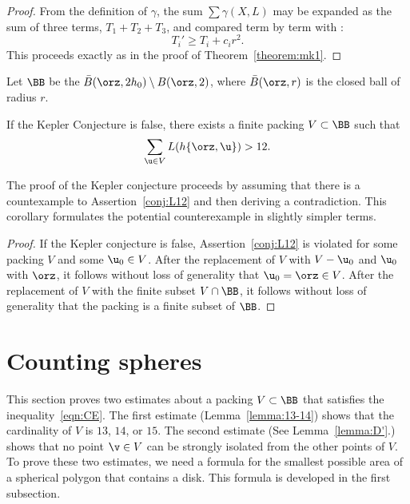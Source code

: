 \begin{proof}
From the definition of $\gamma$, the sum $\sum \gamma(X,L)$ may be
expanded as the sum of three terms, $T_1+T_2+T_3$, and compared term
by term with :
\begin{displaymath} 
T_i' \ge T_i + c_i r^2.
\end{displaymath}
This proceeds exactly as in the proof of Theorem~\ref{theorem:mk1}.
\end{proof}

\begin{definition}[$\BB$] 
Let $\BB$ be the
 $\bar B(\orz,2h_0)\setminus B(\orz,2)$, where
$\bar B(\orz,r)$ is the closed ball of radius $r$.
\end{definition}


\begin{corollary}\label{cor:CE} 
  If the Kepler Conjecture is false, there exists a finite packing
  $V\subset\BB$ such that
\begin{equation}\label{eqn:CE} 
\sum_{ \u\in V} L(h\{\orz, \u\}) > 12.
\end{equation}
\end{corollary}

The proof of the Kepler conjecture proceeds by assuming that there is
a countexample to Assertion~\ref{conj:L12} and then deriving a contradiction.
This corollary formulates the potential counterexample in slightly simpler terms.

\begin{proof} If the Kepler conjecture is false,
Assertion~\ref{conj:L12} is violated for some packing $ V$ and some
$ \u_0\in V$.  After the replacement of $ V$ with $ V - \u_0$ and $
\u_0$ with $\orz$, it follows without loss of generality that $
\u_0=\orz\in V$.  After the replacement of $ V$ with the finite
subset
$V\cap \BB$,
it follows without loss of generality that the packing is a finite subset of $\BB$.
\end{proof}



\section{Counting spheres}

This section proves two estimates about a packing $V\subset \BB$ that
satisfies the inequality~\ref{eqn:CE}.  The first estimate
(Lemma~\ref{lemma:13-14}) shows that the cardinality of $V$ is $13$,
$14$, or $15$.  The second estimate (See Lemma~\ref{lemma:D'}.)  shows
that no point $\v\in V$ can be strongly isolated from the other points
of $V$.    To prove these two estimates, we need a formula for the smallest
possible area of a spherical polygon that contains a disk.  This formula is
developed in the first subsection.

